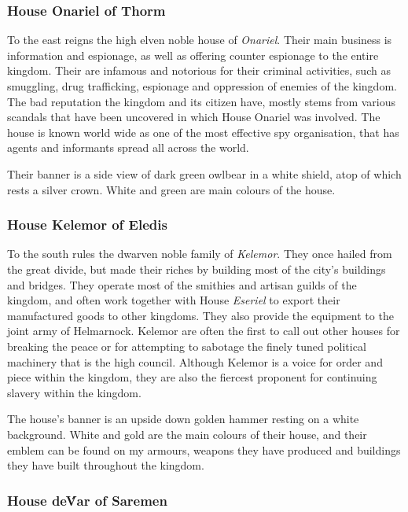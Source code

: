 \subsubsection*{House Onariel of Thorm}

To the east reigns the high elven noble house of \emph{Onariel}. Their main
business is information and espionage, as well as offering counter espionage
to the entire kingdom. Their are infamous and notorious for their criminal
activities, such as smuggling, drug trafficking, espionage and oppression
of enemies of the kingdom. The bad reputation the kingdom and its citizen
have, mostly stems from various scandals that have been uncovered in which
House Onariel was involved. The house is known world wide as one of the most
effective spy organisation, that has agents and informants spread all across
the world.

Their banner is a side view of dark green owlbear in a white shield, atop of
which rests a silver crown. White and green are main colours of the house.

\subsubsection*{House Kelemor of Eledis}

To the south rules the dwarven noble family of \emph{Kelemor}. They once
hailed from the great divide, but made their riches by building most of
the city's buildings and bridges. They operate most of the smithies and
artisan guilds of the kingdom, and often work together with House
\emph{Eseriel} to export their manufactured goods to other kingdoms.
They also provide the equipment to the joint army of Helmarnock. Kelemor
are often the first to call out other houses for breaking the peace or
for attempting to sabotage the finely tuned political machinery that
is the high council. Although Kelemor is a voice for order and piece within
the kingdom, they are also the fiercest proponent for continuing slavery
within the kingdom.

The house's banner is an upside down golden hammer resting on a white
background. White and gold are the main colours of their house, and their
emblem can be found on my armours, weapons they have produced and buildings
they have built throughout the kingdom.

\subsubsection*{House de\'Var of Saremen}

